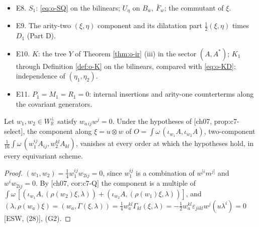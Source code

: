 \begin{itemize}
\item E8. $S_1$: \eqref{eq:o-SQ} on the bilinears; $U_\eta$ on $B_w$, $\bar F_w$; the commutant of $\xi$.
\item E9. The arity-two $(\xi,\eta)$ component and its dilatation part $\tfrac12(\xi,\eta)$ times $D_1$ (Part D).
\item E10. $K$: the tree $Y$ of Theorem \ref{thm:o-ir} (iii) in the sector $(A,A^*)$; $K_1$ through Definition \ref{def:o-K} on the bilinears, compared with \eqref{eq:o-KD}; independence of $(\eta_1,\eta_2)$.
\item E11. $P_1=M_1=R_1=0$: internal insertions and arity-one counterterms along the covariant generators.
\end{itemize}

\begin{proposition}
\label{prop:o-planevanish}
Let $w_1,w_2\in W_{\mathbb R}^\perp$ satisfy $w_{a\,ij}w^j=0$. Under the hypotheses of [ch07, prop:c7-select], the component along $\xi=u\otimes w$ of $O=\int\omega\,(\iota_{w_1}A,\iota_{w_2}A)$, two-component $\tfrac1{16}\int\omega\,(w_1^{ij}A_{ij},w_2^{kl}A_{kl})$, vanishes at every order at which the hypotheses hold, in every equivariant scheme.
\end{proposition}

\begin{proof}
$(w_1,w_2)=\tfrac14w_1^{ij}w_{2ij}=0$, since $w_1^{ij}$ is a combination of $w^{[i}m^{j]}$ and $w^iw_{2ij}=0$. By [ch07, cor:c7-Q] the component is a multiple of $\int\omega\,[(\iota_{w_1}A,(\rho(w_2)\xi,\lambda))+(\iota_{w_2}A,(\rho(w_1)\xi,\lambda))]$, and $(\lambda,\rho(w_a)\xi)=(w_a,\Gamma(\xi,\lambda))=\tfrac14w_a^{kl}\Gamma_{kl}(\xi,\lambda)=-\tfrac12w_a^{kl}\varepsilon_{jikl}w^j(u\lambda^i)=0$ [ESW, (28)], (G2).
\end{proof}
